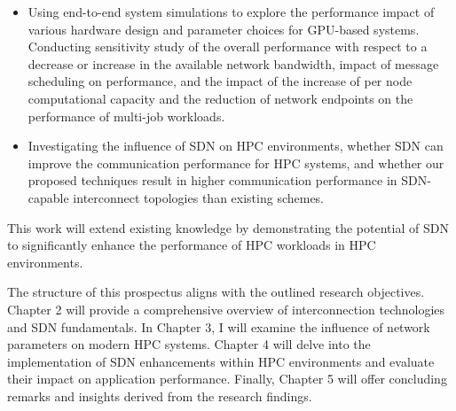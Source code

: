 \begin{itemize} 
\item Using end-to-end system simulations to explore the
performance impact of various hardware design and parameter choices for
GPU-based systems. Conducting sensitivity study of the overall performance with respect to
a decrease or increase in the available network bandwidth, impact of message
scheduling on performance, and the impact of the increase of per node
computational capacity and the reduction of network endpoints on the performance
of multi-job workloads.  
\item Investigating the influence of SDN on HPC
environments, whether SDN can improve the communication performance for HPC
systems, and whether our proposed techniques result in higher communication
performance in SDN- capable interconnect topologies than existing schemes.
\end{itemize} 
This work will extend existing knowledge by demonstrating the
potential of SDN to significantly enhance the performance of HPC workloads in
HPC environments.


The structure of this prospectus aligns with the outlined research objectives.
Chapter 2 will provide a comprehensive overview of interconnection technologies
and SDN fundamentals. In Chapter 3, I will examine the
influence of network parameters on modern HPC systems. Chapter 4 will delve into
the implementation of SDN enhancements within HPC environments and evaluate
their impact on application performance. Finally, Chapter 5 will offer
concluding remarks and insights derived from the research findings.

